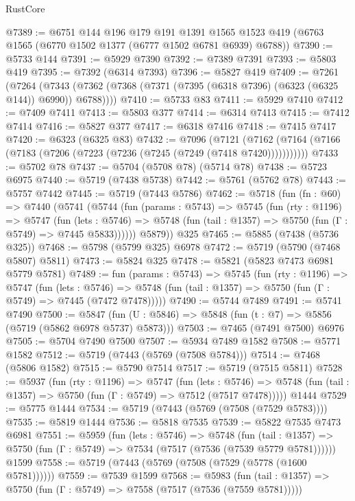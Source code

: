 \begin{lexlean}{RustCore}
\begin{coremodule}
{\begin{coremodule}
{{{{{{{{{{{{{{{{{{{{{{{{{{{{{{{{{{{{{{{{{{{{@7389 := @6751
    @144
    @196
    @179
    @191
    @1391
    @1565
    @1523
    @419
    (@6763 @1565 (@6770 @1502 @1377 (@6777 @1502 @6781 @6939) @6788))
@7390 := @5733 @144
@7391 := @5929 @7390
@7392 := @7389 @7391
@7393 := @5803 @419
@7395 := @7392 (@6314 @7393)
@7396 := @5827 @419
@7409 := @7261
    (@7264 (@7343 (@7362 (@7368 (@7371 (@7395 (@6318 @7396) (@6323 (@6325 @144)) @6990)) @6788))))
@7410 := @5733 @83
@7411 := @5929 @7410
@7412 := @7409 @7411
@7413 := @5803 @377
@7414 := @6314 @7413
@7415 := @7412 @7414
@7416 := @5827 @377
@7417 := @6318 @7416
@7418 := @7415 @7417
@7420 := @6323 (@6325 @83)
@7432 := @7096
    (@7121 (@7162 (@7164 (@7166 (@7183 (@7206 (@7223 (@7236 (@7245 (@7249 (@7418 @7420)))))))))))
@7433 := @5702 @78
@7437 := @5704 (@5708 @78) (@5714 @78)
@7438 := @5723 @6975
@7440 := @5719 (@7438 @5738)
@7442 := @5761 (@5762 @78)
@7443 := @5757 @7442
@7445 := @5719 (@7443 @5786)
@7462 := @5718
    (fun (fn : @60) =>
    @7440
      (@5741
        (@5744
          (fun (params : @5743) =>
          @5745
            (fun (rty : @1196) =>
            @5747
              (fun (lets : @5746) =>
              @5748 (fun (tail : @1357) => @5750 (fun (Γ : @5749) => @7445 @5833))))))
        @5879))
    @325
@7465 := @5885 (@7438 (@5736 @325))
@7468 := @5798 (@5799 @325) @6978
@7472 := @5719 (@5790 (@7468 @5807) @5811)
@7473 := @5824 @325
@7478 := @5821 (@5823 @7473 @6981 @5779 @5781)
@7489 := fun (params : @5743) =>
  @5745
    (fun (rty : @1196) =>
    @5747
      (fun (lets : @5746) =>
      @5748 (fun (tail : @1357) => @5750 (fun (Γ : @5749) => @7445 (@7472 @7478)))))
@7490 := @5744 @7489
@7491 := @5741 @7490
@7500 := @5847 (fun (U : @5846) => @5848 (fun (t : @7) => @5856 (@5719 (@5862 @6978 @5737) @5873)))
@7503 := @7465 (@7491 @7500) @6976
@7505 := @5704 @7490 @7500
@7507 := @5934 @7489 @1582
@7508 := @5771 @1582
@7512 := @5719 (@7443 (@5769 (@7508 @5784)))
@7514 := @7468 (@5806 @1582)
@7515 := @5790 @7514
@7517 := @5719 (@7515 @5811)
@7528 := @5937
    (fun (rty : @1196) =>
    @5747
      (fun (lets : @5746) =>
      @5748 (fun (tail : @1357) => @5750 (fun (Γ : @5749) => @7512 (@7517 @7478)))))
    @1444
@7529 := @5775 @1444
@7534 := @5719 (@7443 (@5769 (@7508 (@7529 @5783))))
@7535 := @5819 @1444
@7536 := @5818 @7535
@7539 := @5822 @7535 @7473 @6981
@7551 := @5959
    (fun (lets : @5746) =>
    @5748
      (fun (tail : @1357) => @5750 (fun (Γ : @5749) => @7534 (@7517 (@7536 (@7539 @5779 @5781))))))
    @1599
@7558 := @5719 (@7443 (@5769 (@7508 (@7529 (@5778 (@1600 @5781))))))
@7559 := @7539 @1599
@7568 := @5983
    (fun (tail : @1357) => @5750 (fun (Γ : @5749) => @7558 (@7517 (@7536 (@7559 @5781)))))
}}}}}}}}}}}}}}}}}}}}}}}}}}}}}}}}}}}}}}}}}}}}
\end{coremodule}}
\end{coremodule}
\end{lexlean}
